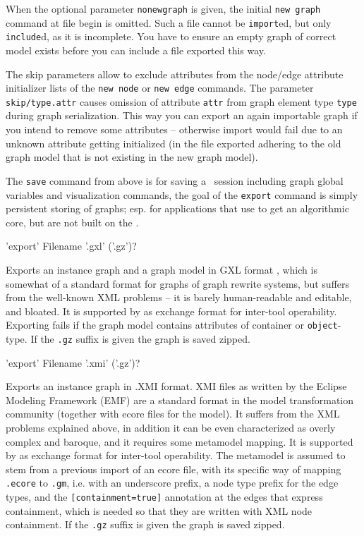 When the optional parameter \texttt{nonewgraph} is given, the initial \texttt{new graph} command at file begin is omitted.
Such a file cannot be \texttt{import}ed, but only \texttt{include}d, as it is incomplete.
You have to ensure an empty graph of correct model exists before you can include a file exported this way.
	
The skip parameters allow to exclude attributes from the node/edge attribute initializer lists of the \texttt{new node} or \texttt{new edge} commands.
The parameter \texttt{skip/type.attr} causes omission of attribute \texttt{attr} from graph element type \texttt{type} during graph serialization.
This way you can export an again importable graph if you intend to remove some attributes -- otherwise import would fail due to an unknown attribute getting initialized (in the file exported adhering to the old graph model that is not existing in the new graph model).

The \texttt{save} command from above is for saving a \GrShell\ session including graph global variables and visualization commands,
the goal of the \texttt{export} command is simply persistent storing of graphs;
esp. for applications that use \GrG{ }to get an algorithmic core, but are not built on the \GrShell.

\begin{rail}
  'export' Filename '.gxl' ('.gz')?
\end{rail}
Exports an instance graph and a graph model in GXL format \cite{GXL,GXL2},
which is somewhat of a standard format for graphs of graph rewrite systems,
but suffers from the well-known XML problems -- it is barely human-readable and editable, and bloated.
It is supported by \GrG{} as exchange format for inter-tool operability.
Exporting fails if the graph model contains attributes of container or \texttt{object}-type.
If the \texttt{.gz} suffix is given the graph is saved zipped.

\begin{rail}
  'export' Filename '.xmi' ('.gz')?
\end{rail}
Exports an instance graph in .XMI format.
XMI files as written by the Eclipse Modeling Framework (EMF) are a standard format in the model transformation community (together with ecore files for the model).
It suffers from the XML problems explained above, in addition it can be even characterized as overly complex and baroque, and it requires some metamodel mapping.
It is supported by \GrG{} as exchange format for inter-tool operability.
The metamodel is assumed to stem from a previous import of an ecore file, with its specific way of mapping \texttt{.ecore} to \texttt{.gm}, i.e. with an underscore prefix, a node type prefix for the edge types, and the \verb#[containment=true]# annotation at the edges that express containment, which is needed so that they are written with XML node containment.
If the \texttt{.gz} suffix is given the graph is saved zipped.

